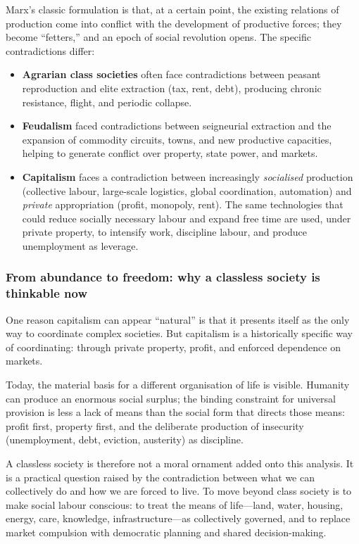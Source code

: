 Marx’s classic formulation is that, at a certain point, the existing relations of production come into conflict with the development of
productive forces; they become ``fetters,'' and an epoch of social revolution opens.\cite{Marx1859} The specific contradictions differ:

\begin{itemize}[leftmargin=1.5em]
  \item \textbf{Agrarian class societies} often face contradictions between peasant reproduction and elite extraction (tax, rent, debt),
        producing chronic resistance, flight, and periodic collapse.\cite{Scott2017}
  \item \textbf{Feudalism} faced contradictions between seigneurial extraction and the expansion of commodity circuits, towns, and new
        productive capacities, helping to generate conflict over property, state power, and markets.\cite{Heller2011}
  \item \textbf{Capitalism} faces a contradiction between increasingly \emph{socialised} production (collective labour, large-scale logistics,
        global coordination, automation) and \emph{private} appropriation (profit, monopoly, rent). The same technologies that could reduce
        socially necessary labour and expand free time are used, under private property, to intensify work, discipline labour, and produce
        unemployment as leverage.\cite{Marx1867}
\end{itemize}

\subsubsection{From abundance to freedom: why a classless society is thinkable now}
\label{sec:abundance-freedom}

One reason capitalism can appear ``natural'' is that it presents itself as the only way to coordinate complex societies. But capitalism is a
historically specific way of coordinating: through private property, profit, and enforced dependence on markets.

Today, the material basis for a different organisation of life is visible. Humanity can produce an enormous social surplus; the binding constraint
for universal provision is less a lack of means than the social form that directs those means: profit first, property first, and the deliberate
production of insecurity (unemployment, debt, eviction, austerity) as discipline.\cite{Marx1867}

A classless society is therefore not a moral ornament added onto this analysis. It is a practical question raised by the contradiction between what we
can collectively do and how we are forced to live. To move beyond class society is to make social labour conscious: to treat the means of life---land,
water, housing, energy, care, knowledge, infrastructure---as collectively governed, and to replace market compulsion with democratic planning and shared
decision-making.

